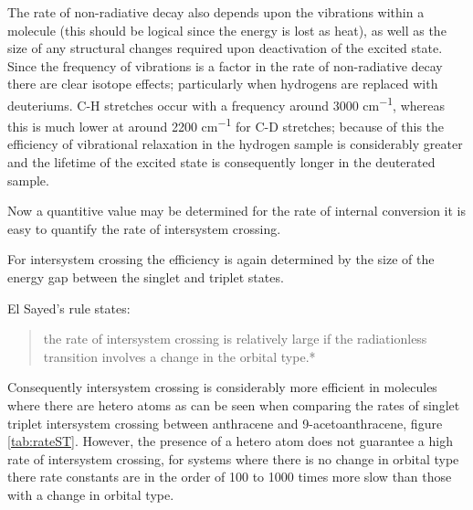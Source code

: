 \documentclass[
]{book}
\begin{document}
The rate of non-radiative decay also depends upon the vibrations within a molecule (this should be logical since the energy is lost as heat), as well as the size of any structural changes required upon deactivation of the excited state. Since the frequency of vibrations is a factor in the rate of non-radiative decay there are clear isotope effects; particularly when hydrogens are replaced with deuteriums. C-H stretches occur with a frequency around 3000 cm\textsuperscript{−1}, whereas this is much lower at around 2200 cm\textsuperscript{−1} for C-D stretches; because of this the efficiency of vibrational relaxation in the hydrogen sample is considerably greater and the lifetime of the excited state is consequently longer in the deuterated sample.

Now a quantitive value may be determined for the rate of internal conversion it is easy to quantify the rate of intersystem crossing.

For intersystem crossing the efficiency is again determined by the size of the energy gap between the singlet and triplet states.

El Sayed's rule states:

\begin{quote}
the rate of intersystem crossing is relatively large if the radiationless transition involves a change in the orbital type.*
\end{quote}

Consequently intersystem crossing is considerably more efficient in molecules where there are hetero atoms as can be seen when comparing the rates of singlet triplet intersystem crossing between anthracene and 9-acetoanthracene, figure \ref{tab:rateST}. However, the presence of a hetero atom does not guarantee a high rate of intersystem crossing, for systems where there is no change in orbital type there rate constants are in the order of 100 to 1000 times more slow than those with a change in orbital type.
\end{document}
